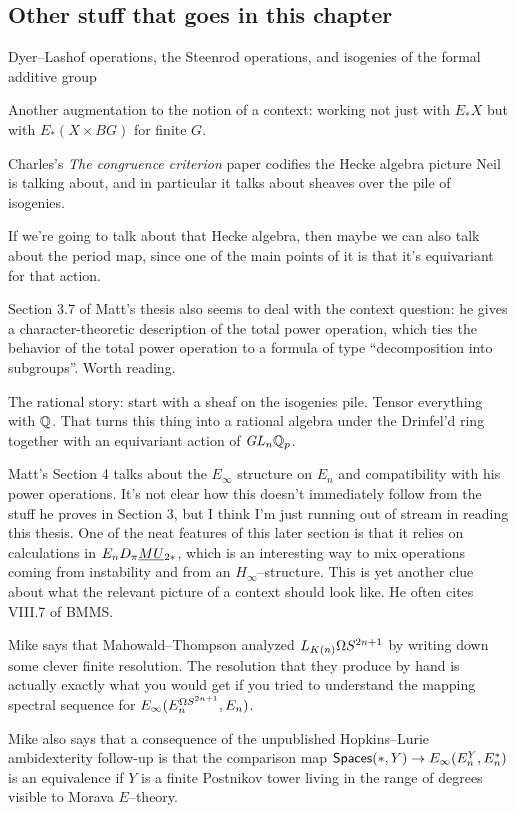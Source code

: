 \subsection*{Other stuff that goes in this chapter}

Dyer--Lashof operations, the Steenrod operations, and isogenies of the formal additive group 

Another augmentation to the notion of a context: working not just with $E_* X$ but with $E_*(X \times BG)$ for finite $G$.

Charles's \textit{The congruence criterion} paper codifies the Hecke algebra picture Neil is talking about, and in particular it talks about sheaves over the pile of isogenies.

If we're going to talk about that Hecke algebra, then maybe we can also talk about the period map, since one of the main points of it is that it's equivariant for that action.

Section 3.7 of Matt's thesis also seems to deal with the context question: he gives a character-theoretic description of the total power operation, which ties the behavior of the total power operation to a formula of type ``decomposition into subgroups''.  Worth reading.

The rational story: start with a sheaf on the isogenies pile.  Tensor everything with $\mathbb{Q}$.  That turns this thing into a rational algebra under the Drinfel'd ring together with an equivariant action of $\mathit{GL}_n \mathbb{Q}_p$.

Matt's Section 4 talks about the $E_\infty$ structure on $E_n$ and compatibility with his power operations.  It's not clear how this doesn't immediately follow from the stuff he proves in Section 3, but I think I'm just running out of stream in reading this thesis.  One of the neat features of this later section is that it relies on calculations in $E_n D_\pi \smash{\underline{MU}}_{2*}$, which is an interesting way to mix operations coming from instability and from an $H_\infty$--structure.  This is yet another clue about what the relevant picture of a context should look like.  He often cites VIII.7 of BMMS.

Mike says that Mahowald--Thompson analyzed $L_{K(n)} \Omega S^{2n+1}$ by writing down some clever finite resolution.  The resolution that they produce by hand is actually exactly what you would get if you tried to understand the mapping spectral sequence for $E_\infty(E_n^{\Omega S^{2n+1}}, E_n)$.

Mike also says that a consequence of the unpublished Hopkins--Lurie ambidexterity follow-up is that the comparison map $\mathsf{Spaces}(*, Y) \to E_\infty(E_n^Y, E_n^*)$ is an equivalence if $Y$ is a finite Postnikov tower living in the range of degrees visible to Morava $E$--theory.

